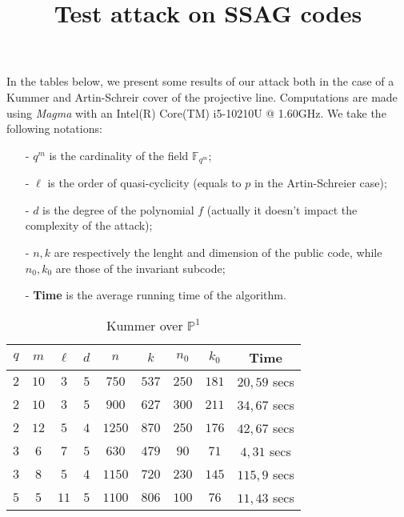 \documentclass[a4paper]{article}
\title{Test attack on SSAG codes}
\author{}
\date{}
\begin{document}
\maketitle

In the tables below, we present some results of our attack both in the case of a Kummer and Artin-Schreir cover of the projective line. Computations are made using \textit{Magma} with an Intel(R) Core(TM) i5-10210U @ 1.60GHz. We take the following notations:
\begin{enumerate}
    \item[-] $q^m$ is the cardinality of the field $\mathbb{F}_{q^m}$;
    \item[-] $\ell$ is the order of quasi-cyclicity (equals to $p$ in the Artin-Schreier case);
    \item[-] $d$ is the degree of the polynomial $f$ (actually it doesn't impact the complexity of the attack);
    \item[-] $n,k$ are respectively the lenght and dimension of the public code, while $n_0,k_0$ are those of the invariant subcode;
    \item[-] \textbf{Time} is the average running time of the algorithm.
\end{enumerate}

\begin{table}[h]
\begin{center}
\begin{tabular}{|c|c|c|c|c|c|c|c|c|}
    \hline
   $q$ & $m$ & $\ell$ & $d$ & $n$ & $k$ & $n_0$ & $k_0$ & \textbf{Time}  \\
    \hline
    $2$ & $10$ & $3$ & $5$ & $750$ & $537$ & $250$ & $181$ & $20,59$ secs \\
    \hline
    $2$ & $10$ & $3$ & $5$ & $900$ & $627$ & $300$ & $211$ & $34,67$ secs \\
    \hline
    $2$ & $12$ & $5$& $4$  & $1250$ & $870$ & $250$ & $176$ & $42,67$ secs \\
     \hline
     $3$  & $6$ & $7$ & $5$ & $630$ & $479$ & $90$ & $71$ & $4,31$ secs \\
     \hline
     $3$ & $8$ & $5$ & $4$ & $1150$ & $720$ & $230$ & $145$ & $115,9$ secs \\
     \hline
      $5$ & $5$ & $11$ & $5$ & $1100$ & $806$ & $100$ & $76$ & $11,43$ secs \\
     \hline
\end{tabular}
\caption{Kummer over $\mathbb{P}^1$}
\end{center}
\end{table}
\end{document}
